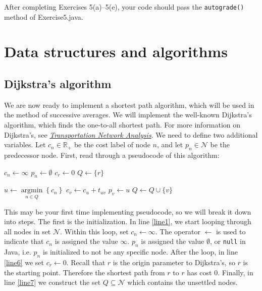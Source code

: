 \documentclass[12pt]{article}
\newcommand{\N}{\mathcal{N}}
\newcommand{\A}{\mathcal{A}}
\DeclareMathOperator*{\argmin}{\arg\min}
\begin{document}
\noindent
After completing Exercises 5(a)--5(e), your code should pass the \texttt{autograde()} method of Exercise5.java. 




\section{Data structures and algorithms}


\subsection{Dijkstra's algorithm}


We are now ready to implement a shortest path algorithm, which will be used in the method of successive averages. We will implement the well-known Dijkstra's algorithm, which finds the one-to-all shortest path. For more information on Dijkstra's, see \href{https://sboyles.github.io/blubook.html}{\textit{Transportation Network Analysis}}. We need to define two additional variables. Let $c_n\in\mathbb{R}_+$ be the cost label of node $n$, and let $p_n\in\N$ be the predecessor node. First, read through a pseudocode of this algorithm:


\vspace{\baselineskip}


\begin{algorithmic}[1]
	\For{$n\in \N$}  \label{line1}
	\State $c_n \leftarrow \infty$
	\State $p_n \leftarrow \emptyset$
	\EndFor
	\State $c_r \leftarrow 0$ \label{line6}
	\State  $Q\leftarrow \{r\}$ \label{line7}
	
	\vspace{0.5\baselineskip}
	
	  \label{line8}
	\State $u\leftarrow \argmin\limits_{n\in Q} \left\{ c_n\right\}$ \label{line9}
	\For{$(u,v)\in\A$} \label{line10}
	  \label{line11}
	\State $c_v \leftarrow c_u + t_{uv}$  \label{line12}
	\State $p_v \leftarrow u$
	\State $Q\leftarrow Q\cup \{v\}$ \label{line14}
	\EndIf
	\EndFor
	\EndWhile \label{line17}
	\EndProcedure 
	
\end{algorithmic}

\vspace{\baselineskip}

\noindent This may be your first time implementing pseudocode, so we will break it down into steps. The first is the initialization. In line \ref{line1}, we start looping through all nodes in set $\N$. Within this loop, set $c_n \leftarrow \infty$. The operator $\leftarrow$ is used to indicate that $c_n$ is assigned the value $\infty$. $p_n$ is assigned the value $\emptyset$, or \texttt{null} in Java, i.e. $p_n$ is initialized to not be any specific node. After the loop, in line \ref{line6} we set $c_r\leftarrow 0$. Recall that $r$ is the origin parameter to Dijkstra's, so $r$ is the starting point. Therefore the shortest path from $r$ to $r$ has cost $0$. Finally, in line \ref{line7} we construct the set $Q\subseteq\N$ which contains the unsettled nodes. 
\end{document}
